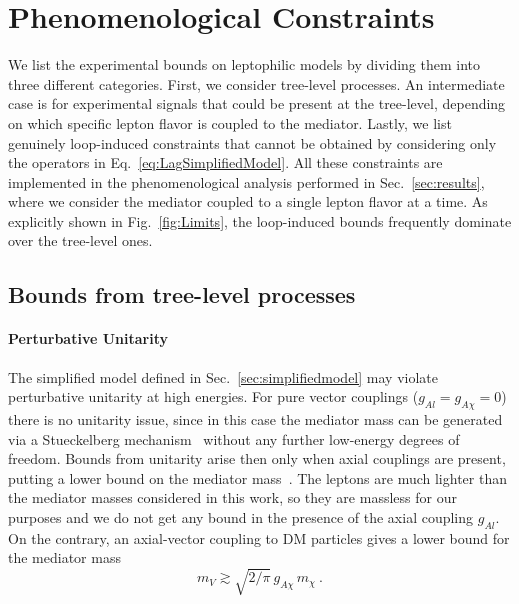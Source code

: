 \documentclass[final,5p,twocolumn]{elsarticle}
\newcommand{\be}{\begin{equation}}
\newcommand{\ee}{\end{equation}}
\newcommand{\Eq}[1]{Eq.~\eqref{#1}}
\begin{document}
\section{Phenomenological Constraints}
\label{sec:constraints}

We list the experimental bounds on leptophilic models by dividing them into three different categories. First, we consider tree-level processes. An intermediate case is for experimental signals that could be present at the tree-level, depending on which specific lepton flavor is coupled to the mediator. Lastly, we list genuinely loop-induced constraints that cannot be obtained by considering only the operators in \Eq{eq:LagSimplifiedModel}.  All these constraints are implemented in the phenomenological analysis performed in Sec.~\ref{sec:results}, where we consider the mediator coupled to a single lepton flavor at a time. As explicitly shown in Fig.~\ref{fig:Limits}, the loop-induced bounds frequently dominate over the tree-level ones.

\subsection{Bounds from tree-level processes}

\vspace{0.2cm}

\paragraph{Perturbative Unitarity} The simplified model defined in Sec.~\ref{sec:simplifiedmodel} may violate perturbative unitarity at high energies. For pure vector couplings ($g_{Al} = g_{A\chi} = 0$) there is no unitarity issue, since in this case the mediator mass can be generated via a Stueckelberg mechanism~\cite{Stueckelberg:1900zz} without any further low-energy degrees of freedom. Bounds from unitarity arise then only when axial couplings are present, putting a lower bound on the mediator mass~\cite{Kahlhoefer:2015bea}. The leptons are much lighter than the mediator masses considered in this work, so they are massless for our purposes and we do not get any bound in the presence of the axial coupling $g_{Al}$. On the contrary, an axial-vector coupling to DM particles gives a lower bound for the mediator mass
\be
m_V \gtrsim \sqrt{2 / \pi} \, g_{A\chi} \, m_\chi \ .
\label{eq:UnitarityBound}
\ee
\end{document}
